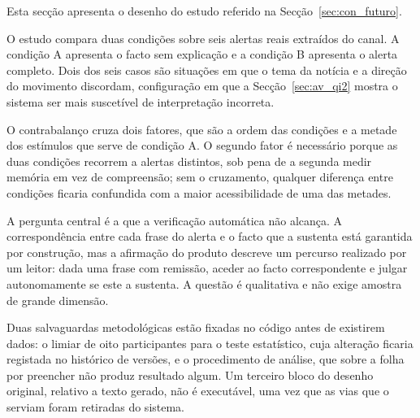 Esta secção apresenta o desenho do estudo referido na Secção~\ref{sec:con_futuro}.

O estudo compara duas condições sobre seis alertas reais extraídos do canal. A condição A apresenta
o facto sem explicação e a condição B apresenta o alerta completo. Dois dos seis casos são situações
em que o tema da notícia e a direção do movimento discordam, configuração em que a
Secção~\ref{sec:av_qi2} mostra o sistema ser mais suscetível de interpretação incorreta.

O contrabalanço cruza dois fatores, que são a ordem das condições e a metade dos estímulos que serve
de condição A. O segundo fator é necessário porque as duas condições recorrem a alertas distintos,
sob pena de a segunda medir memória em vez de compreensão; sem o cruzamento, qualquer diferença
entre condições ficaria confundida com a maior acessibilidade de uma das metades.

A pergunta central é a que a verificação automática não alcança. A correspondência entre cada frase
do alerta e o facto que a sustenta está garantida por construção, mas a afirmação do produto
descreve um percurso realizado por um leitor: dada uma frase com remissão, aceder ao facto
correspondente e julgar autonomamente se este a sustenta. A questão é qualitativa e não exige
amostra de grande dimensão.

Duas salvaguardas metodológicas estão fixadas no código antes de existirem dados: o limiar de oito
participantes para o teste estatístico, cuja alteração ficaria registada no histórico de versões, e
o procedimento de análise, que sobre a folha por preencher não produz resultado algum. Um terceiro
bloco do desenho original, relativo a texto gerado, não é executável, uma vez que as vias que o
serviam foram retiradas do sistema.
